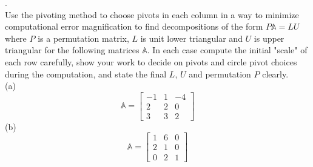 \documentclass[12 pt]{article}
\begin{document}
. \\ Use the pivoting method to choose pivots in each column in a way to minimize computational error magnification to find decompositions 
of the form $P\mathbb{A} = LU$ where $P$ is a permutation matrix, $L$ is unit lower triangular and $U$ is upper triangular for the following matrices 
$\mathbb{A}$. In each case compute the initial "scale" of each row carefully, show your work to decide on pivots and circle pivot choices during the computation, and state the final $L$, $U$ and permutation $P$ clearly. \\
(a) \\
$$
\mathbb{A} = \begin{bmatrix} -1 & 1 & -4 \\ 2 & 2 & 0 \\ 3 & 3 & 2 \end{bmatrix}
$$
\noindent
(b) \\
$$
\mathbb{A} = \begin{bmatrix} 1 & 6 & 0 \\ 2 & 1 & 0 \\ 0 & 2 & 1 \end{bmatrix}
$$
\end{document}
